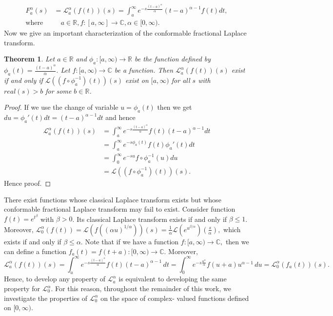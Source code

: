 \documentclass[two side,reqno,12pt]{amsart}
\numberwithin{equation}{section}
\newtheorem{theorem}[lemma]{Theorem}
\theoremstyle{definition}
\begin{document}
\begin{align}
	F_{a}^{\alpha}(s)&=\mathcal{L}_{a}^{\alpha}(f(t))(s)=\int_{a}^{\infty} e^{-s\frac{(t-a)^{\alpha}}{\alpha}}(t-a)^{\alpha-1}f(t)dt,\\\text{where}& \quad a\in \mathbb R, f:[a,\infty]\rightarrow \mathbb C, \alpha\in[0,\infty).
\end{align}
Now we give an important characterization of the conformable fractional Laplace transform.
\begin{theorem}
\label{thm:2.1}
	Let $a\in \mathbb R$ and $\phi_a:[a,\infty)\rightarrow \mathbb R$ be the function defined by
	$\phi_a(t)=\frac{(t-a)^{\alpha}}{\alpha}.$
	Let $f:[a, \infty) \rightarrow \mathbb C$ be a function. Then $\mathcal{L}_{a}^{\alpha}(f(t))(s)$ exist if and only if $\mathcal{L}((f\circ\phi_a^{-1})(t))(s)$ exist on $[a,\infty)$ for all $s$ with $real(s)>b$ for some $b\in \mathbb R$. 
\end{theorem}
\begin{proof}
	If we use the change of variable $u=\phi_a(t)$ then we get\\
	$du=\phi_a'(t)dt=(t-a)^{\alpha-1}dt$ and hence
	\begin{align*}
	\mathcal{L}_{a}^{\alpha}(f(t))(s)&=\int_{a}^{\infty}e^{-s\frac{(t-a)^{\alpha}}{\alpha}}f(t)(t-a)^{\alpha-1}dt\\
	&=\int_{a}^{\infty}e^{-s\phi_a(t)}f(t)\phi_a'(t)dt\\
	&=\int_{0}^{\infty}e^{-su}f\circ\phi_a^{-1}(u)du\\
	&=\mathcal{L}((f\circ\phi_a^{-1})(t))(s).
	\end{align*}
Hence proof.
\end{proof}
There exist functions whose classical Laplace transform exists but whose conformable fractional Laplace transform may fail to exist. 
Consider function $f(t) = e^{t^{\beta}}$ with $\beta > 0$. Its classical Laplace transform exists if and only if $\beta \leq 1$.  Moreover, $
\mathcal{L}_{0}^{\alpha}(f(t)) = \mathcal{L}\left(f\left((\alpha u)^{1/\alpha}\right)\right)(s) = \frac{1}{\alpha} \mathcal{L}\left(e^{u^{\beta/\alpha}}\right)\left(\frac{s}{\alpha}\right),$
which exists if and only if $\beta \leq \alpha.$
\medskip
Note that if we have a function
$ f: [a, \infty) \to \mathbb{C}, $ then we can define a function
$ f_a(t) = f(t + a): [0, \infty) \to \mathbb{C}. $ Moreover,
\[
\mathcal{L}_a^\alpha(f(t))(s) = \int_a^\infty e^{-s \frac{(t-a)^\alpha}{\alpha}} f(t) (t-a)^{\alpha-1} \, dt
= \int_0^\infty e^{-s \frac{u^\alpha}{\alpha}} f(u + a) u^{\alpha-1} \, du = \mathcal{L}_0^\alpha (f_a(t))(s).
\]
Hence, to develop any property of $\mathcal{L}_a^{\alpha}$ is equivalent to developing the same property for $\mathcal{L}_0^{\alpha}$.
For this reason, throughout the remainder of this work, we investigate the properties of $\mathcal{L}_0^\alpha$ on the space of complex- valued functions defined on
$[0,\infty)$.
\end{document}
